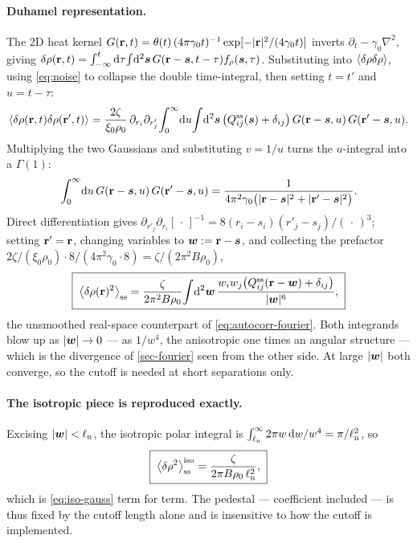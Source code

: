 \documentclass[a5paper]{article}
\begin{document}
\paragraph{Duhamel representation.} The 2D heat kernel $G(\mathbf{r},t) = \theta(t)\,(4\pi\gamma_0 t)^{-1}\exp[-|\mathbf{r}|^2/(4\gamma_0 t)]$ inverts $\partial_t-\gamma_0\nabla^2$, giving $\delta\rho(\mathbf{r},t) = \int_{-\infty}^t\mathrm{d}\tau\!\int\!\mathrm{d}^2\boldsymbol s\,G(\mathbf{r}-\boldsymbol s,t-\tau)f_\rho(\boldsymbol s,\tau)$. Substituting into $\left\langle\delta\rho\delta\rho\right\rangle$, using \eqref{eq:noise} to collapse the double time-integral, then setting $t=t'$ and $u=t-\tau$:
\begin{equation}
    \label{eq:duhamel-eqtime}
    \left\langle\delta\rho(\mathbf{r},t)\delta\rho(\mathbf{r}',t)\right\rangle = \frac{2\zeta}{\xi_0\rho_0}\,\partial_{r_i}\partial_{r'_j}\!\int_0^\infty\!\mathrm{d} u\!\int\!\mathrm{d}^2\boldsymbol s\,\bigl(Q^{\mathrm{ss}}_{ij}(\boldsymbol s)+\delta_{ij}\bigr)\,G(\mathbf{r}-\boldsymbol s,u)\,G(\mathbf{r}'-\boldsymbol s,u).
\end{equation}
Multiplying the two Gaussians and substituting $v=1/u$ turns the $u$-integral into a $\Gamma(1)$:
\begin{equation}
    \int_0^\infty\!\mathrm{d} u\,G(\mathbf{r}-\boldsymbol s,u)\,G(\mathbf{r}'-\boldsymbol s,u) = \frac{1}{4\pi^2\gamma_0\bigl(|\mathbf{r}-\boldsymbol s|^2+|\mathbf{r}'-\boldsymbol s|^2\bigr)}.
\end{equation}
Direct differentiation gives $\partial_{r'_j}\partial_{r_i}[\,\cdot\,]^{-1} = 8(r_i-s_i)(r'_j-s_j)/(\,\cdot\,)^{3}$; setting $\mathbf{r}'=\mathbf{r}$, changing variables to $\boldsymbol w := \mathbf{r}-\boldsymbol s$, and collecting the prefactor $2\zeta/(\xi_0\rho_0)\cdot 8/(4\pi^2\gamma_0\cdot 8) = \zeta/(2\pi^2 B\rho_0)$,
\begin{equation}
    \label{eq:autocorr-realspace}
    \boxed{\;
    \left\langle\delta\rho(\mathbf{r})^2\right\rangle_{\mathrm{ss}} = \frac{\zeta}{2\pi^2 B\rho_0}\!\int\!\mathrm{d}^2\boldsymbol w\,\frac{w_i w_j\bigl(Q^{\mathrm{ss}}_{ij}(\mathbf{r}-\boldsymbol w)+\delta_{ij}\bigr)}{|\boldsymbol w|^6},
    \;}
\end{equation}
the unsmoothed real-space counterpart of \eqref{eq:autocorr-fourier}. Both integrands blow up as $|\boldsymbol w|\to0$ --- as $1/w^4$, the anisotropic one times an angular structure --- which is the divergence of \cref{sec-fourier} seen from the other side. At large $|\boldsymbol w|$ both converge, so the cutoff is needed at short separations only.

\paragraph{The isotropic piece is reproduced exactly.} Excising $|\boldsymbol w|<\ell_{\rm n}$, the isotropic polar integral is $\int_{\ell_{\rm n}}^\infty 2\pi w\,\mathrm{d} w/w^4 = \pi/\ell_{\rm n}^2$, so
\begin{equation}
    \label{eq:iso-hard}
    \boxed{\;\left\langle\delta\rho^2\right\rangle^\mathrm{iso}_{\mathrm{ss}} = \frac{\zeta}{2\pi B\rho_0\,\ell_{\rm n}^2},\;}
\end{equation}
which is \eqref{eq:iso-gauss} term for term. The pedestal --- coefficient included --- is thus fixed by the cutoff length alone and is insensitive to how the cutoff is implemented.
\end{document}
